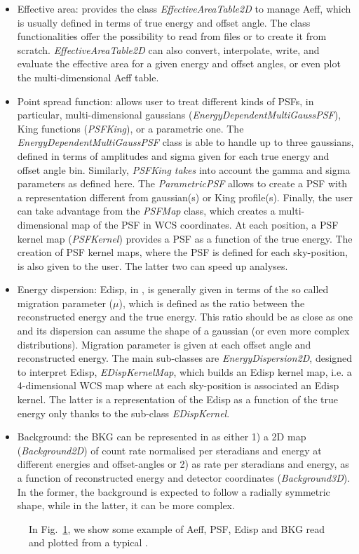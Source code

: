 \begin{itemize}  
\item Effective area: \gammapy provides the class {\it EffectiveAreaTable2D} to manage Aeff, which is usually defined in terms of true energy and offset angle. The class functionalities offer the possibility to read from files or to create it from scratch. {\it EffectiveAreaTable2D} can also convert, interpolate, write, and evaluate the effective area for a given energy and offset angles, or even plot the multi-dimensional Aeff table. 

\item Point spread function: \gammapy allows user to treat different kinds of PSFs, in particular, multi-dimensional gaussians ({\it EnergyDependentMultiGaussPSF}), King functions ({\it PSFKing}), or a parametric one. The {\it EnergyDependentMultiGaussPSF} class is able to handle up to three gaussians, defined in terms of amplitudes and sigma given for each true energy and offset angle bin. Similarly, {\it PSFKing takes} into account the gamma and sigma parameters as defined here. The {\it ParametricPSF} allows to create a PSF with a representation different from gaussian(s) or King profile(s). Finally, the user can take advantage from the {\it PSFMap} class, which creates a multi-dimensional map of the PSF in WCS coordinates. At each position, a PSF kernel map ({\it PSFKernel}) provides a PSF as a function of the true energy. The creation of PSF kernel maps, where the PSF is defined for each sky-position, is also given to the user. The latter two can speed up analyses. 

\item Energy dispersion: Edisp, in \iact, is generally given in terms of the so called migration parameter ($\mu$), which is defined as the ratio between the reconstructed energy and the true energy. This ratio should be as close as one and its dispersion can assume the shape of a gaussian (or even more complex distributions). Migration parameter is given at each offset angle and reconstructed energy. The main sub-classes are {\it EnergyDispersion2D}, designed to interpret Edisp, {\it EDispKernelMap}, which builds an Edisp kernel map, i.e. a 4-dimensional WCS map where at each sky-position is associated an Edisp kernel. The latter is a representation of the Edisp as a function of the true energy only thanks to the sub-class {\it EDispKernel}. 

\item Background: the BKG can be represented in \gammapy as either 1) a 2D map ({\it Background2D}) of count rate normalised per steradians and energy at different energies and offset-angles or 2) as rate per steradians and energy, as a function of reconstructed energy and detector coordinates ({\it Background3D}). In the former, the background is expected to follow a radially symmetric shape, while in the latter, it can be more complex.

\end{itemize} 

\begin{figure}

	\caption{In Fig.~\ref{ig*:minted:irf_examples}, we show some example of Aeff, PSF, Edisp and BKG read and plotted from a typical \irf.}
	\label{ig*:minted:irf_examples}
\end{figure}

